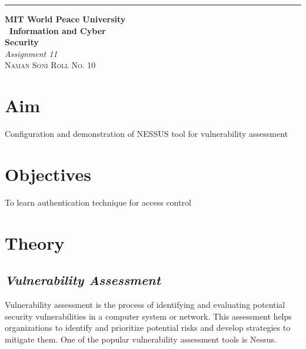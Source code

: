 \documentclass{article}
\begin{document}
	\begin{titlepage} %
	
	\raggedleft\rule{1pt}{\textheight} %
	\hspace{0.05\textwidth} %
	\parbox[b]{0.75\textwidth}
	{ %
		
		{\Huge\bfseries MIT World Peace University \\[0.5\baselineskip] \ Information and Cyber \\ Security}\\[2\baselineskip] %
		{\large\textit{Assignment 11}}\\[4\baselineskip] %
		{\Large\textsc{Naman Soni Roll No. 10}} %
		
		\vspace{0.5\textheight} %
	}
	
\end{titlepage}
\tableofcontents
\pagebreak
\section{\textbf{Aim}}
Configuration and demonstration of NESSUS tool for vulnerability assessment

\section{\textbf{Objectives}}
To learn authentication technique for access control

\section{\textbf{Theory}}
\subsection{\textit{Vulnerability Assessment}}
Vulnerability assessment is the process of identifying and evaluating potential security vulnerabilities in a computer system or network. This assessment helps organizations to identify and prioritize potential risks and develop strategies to mitigate them. One of the popular vulnerability assessment tools is Nessus.\\
\end{document}
